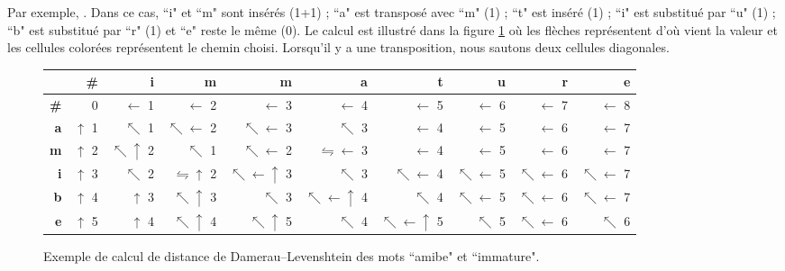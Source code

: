 \documentclass{KodeBook}
\begin{document}
Par exemple, . 
Dans ce cas, ``i" et ``m" sont insérés (1+1) ; ``a" est transposé avec ``m" (1) ; ``t" est inséré (1) ; ``i" est substitué par ``u" (1) ;  ``b" est substitué par ``r" (1) et ``e" reste le même (0).
Le calcul est illustré dans la figure \ref{fig:dam-laven-distance} où les flèches représentent d'où vient la valeur et les cellules colorées représentent le chemin choisi.
Lorsqu'il y a une transposition, nous sautons deux cellules diagonales.
\begin{figure}[ht]
	\centering
	\begin{tabular}{|r|r|r|r|r|r|r|r|r|r|}
		\hline
		&\bfseries \# &\bfseries i &\bfseries m &\bfseries m &\bfseries a &\bfseries t &\bfseries u &\bfseries r &\bfseries e \\
		\hline
		\bfseries \# & 0 & \cellcolor{green!25} $ \leftarrow $ 1 & \cellcolor{green!25} $ \leftarrow $ 2 & $ \leftarrow $ 3 & $ \leftarrow $ 4 & $ \leftarrow $ 5 & $ \leftarrow $ 6 & $ \leftarrow $ 7 & $ \leftarrow $ 8\\
		\hline
		\bfseries a & $ \uparrow $ 1 & $ \nwarrow $ 1 & $ \nwarrow\leftarrow $ 2 & $ \nwarrow\leftarrow $ 3 & $ \nwarrow $ 3 & $ \leftarrow $ 4 & $ \leftarrow $ 5 & $ \leftarrow $ 6 & $ \leftarrow $ 7 \\
		\hline
		\bfseries m & $ \uparrow $ 2 & $ \nwarrow\uparrow $ 2 & $\nwarrow $ 1 & $\nwarrow\leftarrow $ 2 & \cellcolor{green!25} $\leftrightharpoons\leftarrow $ 3 & \cellcolor{green!25} $\leftarrow $ 4 & $\leftarrow $ 5 & $\leftarrow $ 6 & $\leftarrow $ 7\\
		\hline
		\bfseries i & $ \uparrow $ 3 & $ \nwarrow $ 2 & $\leftrightharpoons\uparrow $ 2 & $\nwarrow\leftarrow\uparrow $ 3 & $\nwarrow $ 3 &  $\nwarrow\leftarrow $ 4 & \cellcolor{green!25} $\nwarrow\leftarrow $ 5 & $\nwarrow\leftarrow $ 6 & $\nwarrow\leftarrow $ 7\\
		\hline
		\bfseries b & $ \uparrow $ 4 & $ \uparrow $ 3 & $\nwarrow\uparrow $ 3 & $\nwarrow $ 3 & $\nwarrow\leftarrow\uparrow $ 4 & $\nwarrow $ 4 & $\nwarrow\leftarrow $ 5 & \cellcolor{green!25} $\nwarrow\leftarrow $ 6 & $\nwarrow\leftarrow $ 7\\
		\hline
		\bfseries e & $ \uparrow $ 5 & $ \uparrow $ 4 & $\nwarrow\uparrow $ 4 & $\nwarrow\uparrow $ 5 & $\nwarrow $ 4 & $\nwarrow\leftarrow\uparrow $ 5 & $\nwarrow $ 5 & $\nwarrow\leftarrow $ 6 & \cellcolor{green!25} $\nwarrow $ 6\\
		\hline
	\end{tabular}
	\caption[Exemple de calcul de distance de Damerau–Levenshtein]{Exemple de calcul de distance de Damerau–Levenshtein des mots ``amibe"  et ``immature".}
	\label{fig:dam-laven-distance}
\end{figure}
\end{document}
